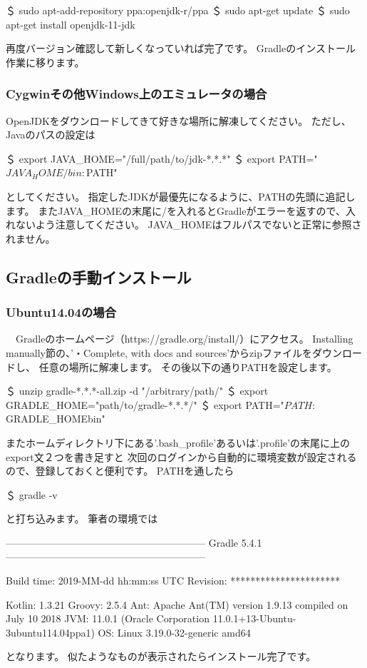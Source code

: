 \documentclass[a4paper,12pt]{article}
\begin{document}
\begin{shell}
＄ sudo apt-add-repository ppa:openjdk-r/ppa
＄ sudo apt-get update
＄ sudo apt-get install openjdk-11-jdk
\end{shell}
再度バージョン確認して新しくなっていれば完了です。
Gradleのインストール作業に移ります。

\subsubsection{Cygwinその他Windows上のエミュレータの場合}

OpenJDKをダウンロードしてきて好きな場所に解凍してください。
ただし、Javaのパスの設定は
\begin{shell}[JDKのPATHの設定]
＄ export JAVA_HOME="/full/path/to/jdk-*.*.*"
＄ export PATH="${JAVA_HOME}/bin:${PATH}"
\end{shell}
としてください。
指定したJDKが最優先になるように、PATHの先頭に追記します。
またJAVA\_HOMEの末尾に/を入れるとGradleがエラーを返すので、入れないよう注意してください。
JAVA\_HOMEはフルパスでないと正常に参照されません。

\subsection{Gradleの手動インストール}

\subsubsection{Ubuntu14.04の場合}

　Gradleのホームページ（https://gradle.org/install/）にアクセス。
Installing manually節の、'・Complete, with docs and sources'からzipファイルをダウンロードし、
任意の場所に解凍します。
その後以下の通りPATHを設定します。

\begin{shell}[PATHの設定]
＄ unzip gradle-*.*.*-all.zip -d "/arbitrary/path/"
＄ export GRADLE_HOME="path/to/gradle-*.*.*/"
＄ export PATH="${PATH}:${GRADLE_HOME}bin"
\end{shell}
またホームディレクトリ下にある'.bash\_profile'あるいは'.profile'の末尾に上のexport文２つを書き足すと
次回のログインから自動的に環境変数が設定されるので、登録しておくと便利です。
PATHを通したら
\begin{shell}[セットアップの確認]
＄ gradle -v
\end{shell}
と打ち込みます。
筆者の環境では
\begin{shell}[Gradleのバージョン表示(例)]
------------------------------------------------------------
Gradle 5.4.1
------------------------------------------------------------

Build time:   2019-MM-dd hh:mm:ss UTC
Revision:     **********************

Kotlin:       1.3.21
Groovy:       2.5.4
Ant:          Apache Ant(TM) version 1.9.13 compiled on July 10 2018
JVM:          11.0.1 (Oracle Corporation 11.0.1+13-Ubuntu-3ubuntu114.04ppa1)
OS:           Linux 3.19.0-32-generic amd64

\end{shell}
となります。
似たようなものが表示されたらインストール完了です。
\end{document}
